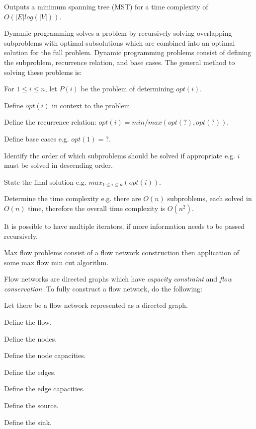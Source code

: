 \subject{Kruskal's Algorithm} %

    Outputs a minimum spanning tree (MST) for a time complexity of $O(|E|log(|V|))$.

\subject{Dynamic Programming} %

    Dynamic programming solves a problem by recursively solving overlapping subproblems with optimal subsolutions which are combined into an optimal solution for the full problem. Dynamic programming problems consist of defining the subproblem, recurrence relation, and base cases. The general method to solving these problems is:
    \startitemize[n]
        \item For $1 \leq i \leq n$, let $P(i)$ be the problem of determining $opt(i)$.
        \item Define $opt(i)$ in context to the problem.
        \item Define the recurrence relation: $opt(i) = min/max(opt(?), opt(?))$.
        \item Define base cases e.g. $opt(1) = ?$.
        \item Identify the order of which subproblems should be solved if appropriate e.g. $i$ must be solved in descending order.
        \item State the final solution e.g. $max_{1 \leq i \leq n}(opt(i))$.
        \item Determine the time complexity e.g. there are $O(n)$ subproblems, each solved in $O(n)$ time, therefore the overall time complexity is $O(n^{2})$.
    \stopitemize

    It is possible to have multiple iterators, if more information needs to be passed recursively.

\subject{Max Flow}

    Max flow problems consist of a flow network construction then application of some max flow min cut algorithm.


        Flow networks are directed graphs which have {\it capacity constraint} and {\it flow conservation}. To fully construct a flow network, do the following:

        \startitemize[n]
            \item Let there be a flow network represented as a directed graph.
            \item Define the flow.
            \item Define the nodes.
            \item Define the node capacities.
            \item Define the edges.
            \item Define the edge capacities.
            \item Define the source.
            \item Define the sink.
        \stopitemize

